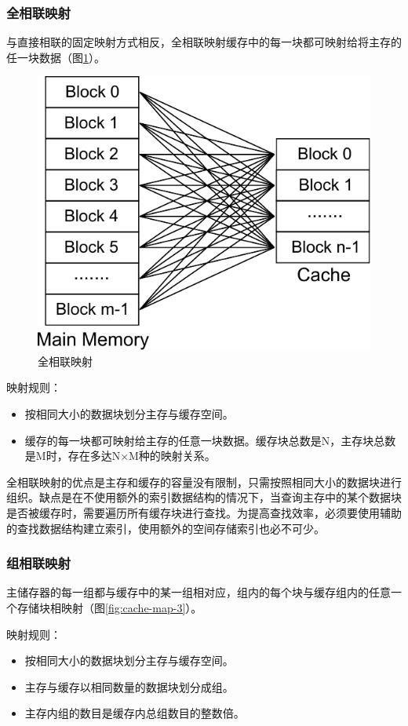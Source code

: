 \subsubsection{全相联映射}

与直接相联的固定映射方式相反，全相联映射缓存中的每一块都可映射给将主存的任一块数据（图\ref{fig:cache-map-2}）。

\begin{figure}[!htb]
\centering
\includegraphics[width=0.4\linewidth]{./graph/cache-map-2}
\caption{全相联映射}
\label{fig:cache-map-2}
\end{figure}

映射规则：
\begin{itemize}
\item 按相同大小的数据块划分主存与缓存空间。
\item 缓存的每一块都可映射给主存的任意一块数据。缓存块总数是N，主存块总数是M时，存在多达N×M种的映射关系。
\end{itemize}

全相联映射的优点是主存和缓存的容量没有限制，只需按照相同大小的数据块进行组织。缺点是在不使用额外的索引数据结构的情况下，当查询主存中的某个数据块是否被缓存时，需要遍历所有缓存块进行查找。为提高查找效率，必须要使用辅助的查找数据结构建立索引，使用额外的空间存储索引也必不可少。

\subsubsection{组相联映射}

主储存器的每一组都与缓存中的某一组相对应，组内的每个块与缓存组内的任意一个存储块相映射（图\ref{fig:cache-map-3}）。

映射规则：
\begin{itemize}
\item 按相同大小的数据块划分主存与缓存空间。
\item 主存与缓存以相同数量的数据块划分成组。
\item 主存内组的数目是缓存内总组数目的整数倍。
\end{itemize}

